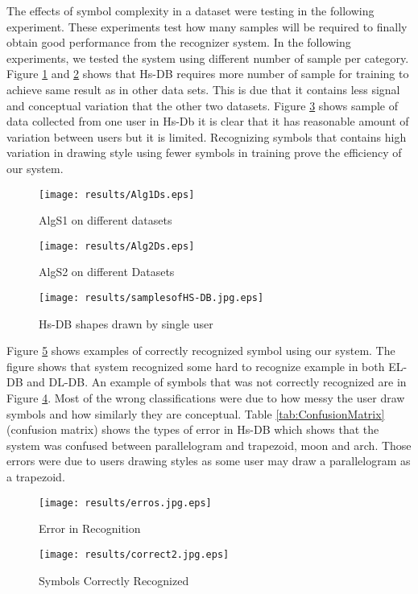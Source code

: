  The effects of symbol complexity in a dataset were testing in the following experiment. These experiments test how many samples will be required to finally obtain good performance from the recognizer system. In the following experiments, we tested the system using different number of sample per category. 
 Figure \ref{fig:Alg1Ds} and \ref{fig:Alg2Ds} shows that Hs-DB requires more number of sample for training to achieve same result as in other data sets. This is due that it contains less signal and conceptual variation that the other two datasets. Figure \ref{fig:samplesofHS-DB.jpg} shows sample of data collected from one user in Hs-Db it is clear that it has reasonable amount of variation between users but it is limited. Recognizing symbols that contains high variation in drawing style using fewer symbols in training prove the efficiency of our system.
 \begin{figure}
	\centering
		\texttt{[image: results/Alg1Ds.eps]}
	\caption{AlgS1 on different datasets}
	\label{fig:Alg1Ds}
\end{figure}
\begin{figure}
	\centering
		\texttt{[image: results/Alg2Ds.eps]}
	\caption{AlgS2 on different Datasets }
	\label{fig:Alg2Ds}
\end{figure}
 \begin{figure}
	\centering
	\texttt{[image: results/samplesofHS-DB.jpg.eps]}
	\caption[Hs-DB shapes drawn by single user]{Hs-DB shapes drawn by single user \cite{HeloiseBeautification} }
	\label{fig:samplesofHS-DB.jpg}
\end{figure}
  Figure \ref{fig:correct2.jpg} shows examples of correctly recognized symbol using our system. The figure shows that system recognized some hard to recognize example in both EL-DB and DL-DB. An example of symbols that was not correctly recognized are in Figure \ref{fig:erros}. Most of the wrong classifications were due to how messy the user draw symbols and how similarly they are conceptual. Table \ref{tab:ConfusionMatrix} (confusion matrix) shows the types of error in Hs-DB which shows that the system was confused between parallelogram and trapezoid, moon and arch. Those errors were due to users drawing styles as some user may draw a parallelogram as a trapezoid. 
  
\begin{figure}
	\centering
		\texttt{[image: results/erros.jpg.eps]}
	\caption{Error in Recognition }
	\label{fig:erros}
\end{figure}
\begin{figure}
	\centering
		\texttt{[image: results/correct2.jpg.eps]}
	\caption{Symbols Correctly Recognized}
	\label{fig:correct2.jpg}
\end{figure}

